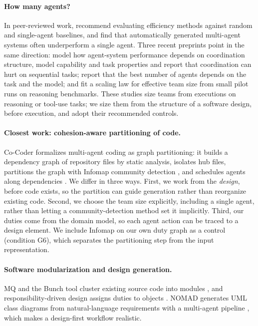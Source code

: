 \paragraph{How many agents?} In peer-reviewed work, \citet{zhang2026rethinking} recommend evaluating efficiency methods against random and single-agent baselines, and \citet{jwalapuram2026illusion} find that automatically generated multi-agent systems often underperform a single agent. Three recent preprints point in the same direction: \citet{kim2025scaling} model how agent-system performance depends on coordination structure, model capability and task properties and report that coordination can hurt on sequential tasks; \citet{li2026scalingbehavior} report that the best number of agents depends on the task and the model; and \citet{bertalanic2026ringelmann} fit a scaling law for effective team size from small pilot runs on reasoning benchmarks. These studies size teams from executions on reasoning or tool-use tasks; we size them from the structure of a software design, before execution, and adopt their recommended controls.

\paragraph{Closest work: cohesion-aware partitioning of code.} Co-Coder formalizes multi-agent coding as graph partitioning: it builds a dependency graph of repository files by static analysis, isolates hub files, partitions the graph with Infomap community detection \citep{rosvall2008infomap}, and schedules agents along dependencies \citep{yang2026cocoder}. We differ in three ways. First, we work from the \emph{design}, before code exists, so the partition can guide generation rather than reorganize existing code. Second, we choose the team size explicitly, including a single agent, rather than letting a community-detection method set it implicitly. Third, our duties come from the domain model, so each agent action can be traced to a design element. We include Infomap on our own duty graph as a control (condition G6), which separates the partitioning step from the input representation.

\paragraph{Software modularization and design generation.} MQ and the Bunch tool cluster existing source code into modules \citep{mancoridis1998bunch,mitchell2006bunch}, and responsibility-driven design assigns duties to objects \citep{wirfsbrock1989responsibility}. NOMAD generates UML class diagrams from natural-language requirements with a multi-agent pipeline \citep{giannouris2025nomad}, which makes a design-first workflow realistic.

